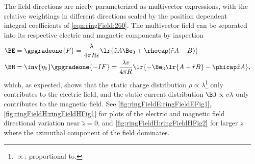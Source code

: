The field directions are nicely parameterized as multivector expressions, with the relative weightings in different directions scaled by the position dependent integral coefficients of \cref{eqn:ringField:260}.
The multivector field can be separated into its respective electric and magnetic components by inspection
\begin{equation}\label{eqn:ringField:240}
\begin{aligned}
\BE &=
\gpgradeone{F}
=
\frac{\lambda}{4 \pi R \epsilon} \lr{ \tilde{z} A \Be_3 + \rhocap( \tilde{r} A - B) } \\
\BH &=
\inv{\eta_0} \gpgradeone{-I F}
=
\frac{\lambda v}{4 \pi R } \lr{ -\Be_3 \lr{ A + \tilde{r} B } - \phicap \tilde{z} A },
\end{aligned}
\end{equation}
\index{\(\propto\)}
which, as expected, shows that the static charge distribution \( \rho \propto \lambda \)\footnote{\(\propto\): proportional to.} only contributes to the electric field, and the static current distribution \( \BJ \propto v \lambda \) only contributes to the magnetic field.
See
\cref{fig:ringFieldE:ringFieldEFig1}, \cref{fig:ringFieldH:ringFieldHFig1}
for plots of the electric and magnetic field directional variation near \( \tilde{z} = 0 \), and \cref{fig:ringFieldH:ringFieldHFig2} for larger \( z \) where the azimuthal component of the field dominates.


